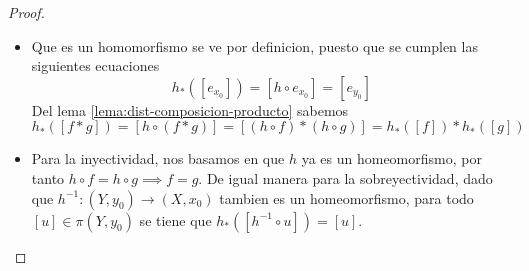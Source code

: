 {\begin{proof}
\begin{itemize}
  \item Que es un homomorfismo se ve por definicion, puesto que se cumplen
    las siguientes ecuaciones
    \[ h_{*} ([e_{x_0}]) = [h \circ e_{x_0}] = [e_{y_0}]\]
    Del lema \ref{lema:dist-composicion-producto} sabemos
    \[ h_{*} ([f * g]) = [h \circ (f * g)] = [(h \circ f) * (h \circ g)]
      = h_{*} ([f]) * h_{*} ([g])\]

  \item Para la inyectividad, nos basamos en que \(h\) ya es un
    homeomorfismo, por tanto \( h \circ f = h \circ g \implies f = g \).
    De igual manera para la sobreyectividad, dado que \(h^{-1} : (Y,y_0)
    \to (X, x_0)\) tambien es un homeomorfismo, para todo \([u] \in \pi
    (Y, y_0) \) se tiene que \(h_{*} ([h^{-1} \circ u]) = [u]\).
  \end{itemize}
\end{proof}

}
